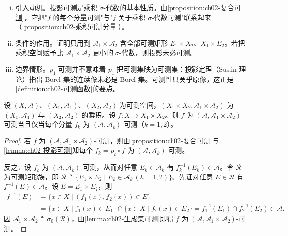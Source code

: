 \documentclass[../../main.tex]{subfiles}%
\begin{document}
\begin{remark}\label{remark:ch02-投影可测}
\begin{enumerate}[(i)]
\item 引入动机。投影可测是乘积 $\sigma$-代数的基本性质。由\cref{proposition:ch02-复合可测}，它把"$f$ 的每个分量可测"与"$f$ 关于乘积 $\sigma$-代数可测"联系起来（\cref{proposition:ch02-乘积可测分量}）。
\item 条件的作用。证明只用到 $\mathscr A_1\times\mathscr A_2$ 含全部可测矩形 $E_1\times X_2$、$X_1\times E_2$。若把乘积空间赋予比 $\mathscr A_1\times\mathscr A_2$ 更小的 $\sigma$-代数，则投影未必可测。
\item 边界情形。$p_1$ 可测并不意味着 $p_1$ 把可测集映为可测集：投影定理（Suslin 理论）指出 Borel 集的连续像未必是 Borel 集。可测性只关乎原像，这正是\cref{definition:ch02-可测函数}的要点。
\end{enumerate}
\end{remark}

\begin{proposition}\label{proposition:ch02-乘积可测分量}
设 $(X,\mathscr A)$、$(X_1,\mathscr A_1)$、$(X_2,\mathscr A_2)$ 为可测空间，$(X_1\times X_2,\mathscr A_1\times\mathscr A_2)$ 为 $(X_1,\mathscr A_1)$ 与 $(X_2,\mathscr A_2)$ 的乘积。设 $f:X\to X_1\times X_2$。则 $f$ 为 $(\mathscr A,\mathscr A_1\times\mathscr A_2)$-可测当且仅当每个分量 $f_k$ 为 $(\mathscr A,\mathscr A_k)$-可测（$k=1,2$）。
\end{proposition}

\begin{proof}
若 $f$ 为 $(\mathscr A,\mathscr A_1\times\mathscr A_2)$-可测，则由\cref{proposition:ch02-复合可测}与\cref{lemma:ch02-投影可测}知每个 $f_k=p_k\circ f$ 为 $(\mathscr A,\mathscr A_k)$-可测。

反之，设 $f_k$ 为 $(\mathscr A,\mathscr A_k)$-可测，从而对任意 $E_k\in\mathscr A_k$ 有 $f_k^{-1}(E_k)\in\mathscr A$。令 $\mathscr R$ 为可测矩形族，即 $\mathscr R\triangleq\{E_1\times E_2\mid E_k\in\mathscr A_k\ (k=1,2)\}$。先证对任意 $E\in\mathscr R$ 有 $f^{-1}(E)\in\mathscr A$。设 $E=E_1\times E_2$，则
\begin{align*}
f^{-1}(E)&=\{x\in X\mid(f_1(x),f_2(x))\in E\}\\
&=\{x\in X\mid f_1(x)\in E_1\}\cap\{x\in X\mid f_2(x)\in E_2\}
=f_1^{-1}(E_1)\cap f_2^{-1}(E_2)\in\mathscr A.
\end{align*}
因 $\mathscr A_1\times\mathscr A_2\triangleq\sigma_0(\mathscr R)$，由\cref{lemma:ch02-生成集可测}即得 $f$ 为 $(\mathscr A,\mathscr A_1\times\mathscr A_2)$-可测。
\end{proof}
\end{document}
